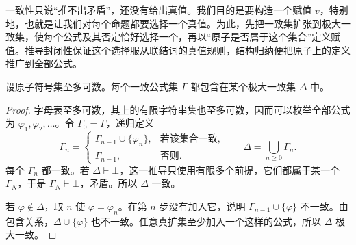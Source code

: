 \documentclass[lang=cn,a4paper,fontset=none,zihao=false,10pt,openany,twoside]{beautybook}
\numberwithin{algorithm}{chapter}
\begin{document}
\begin{remark}[完备性证明的思路]
一致性只说“推不出矛盾”，还没有给出真值。我们目的是要构造一个赋值 $v$，特别地，也就是让我们对每个命题都要选择一个真值。为此，先把一致集扩张到极大一致集，使每个公式及其否定恰好选择一个，再以“原子是否属于这个集合”定义赋值。推导封闭性保证这个选择服从联结词的真值规则，结构归纳便把原子上的定义推广到全部公式。
\end{remark}

\begin{lemma}[一致扩张]
设原子符号集至多可数。每个一致公式集 $\Gamma$ 都包含在某个极大一致集 $\Delta$ 中。
\end{lemma}
\begin{proof}
字母表至多可数，其上的有限字符串集也至多可数，因而可以枚举全部公式为 $\varphi_1,\varphi_2,\ldots$。令 $\Gamma_0=\Gamma$，递归定义
\[
 \Gamma_n=
 \begin{cases}
 \Gamma_{n-1}\cup\{\varphi_n\},&\text{若该集合一致},\\
 \Gamma_{n-1},&\text{否则}.
 \end{cases}
 \qquad \Delta=\bigcup_{n\geq0}\Gamma_n.
\]
每个 $\Gamma_n$ 都一致。若 $\Delta\vdash\bot$，这一推导只使用有限多个前提，它们都属于某一个 $\Gamma_N$，于是 $\Gamma_N\vdash\bot$，矛盾。所以 $\Delta$ 一致。

若 $\varphi\notin\Delta$，取 $n$ 使 $\varphi=\varphi_n$。在第 $n$ 步没有加入它，说明 $\Gamma_{n-1}\cup\{\varphi\}$ 不一致。由包含关系，$\Delta\cup\{\varphi\}$ 也不一致。任意真扩集至少加入一个这样的公式，所以 $\Delta$ 极大一致。
\end{proof}
\end{document}
